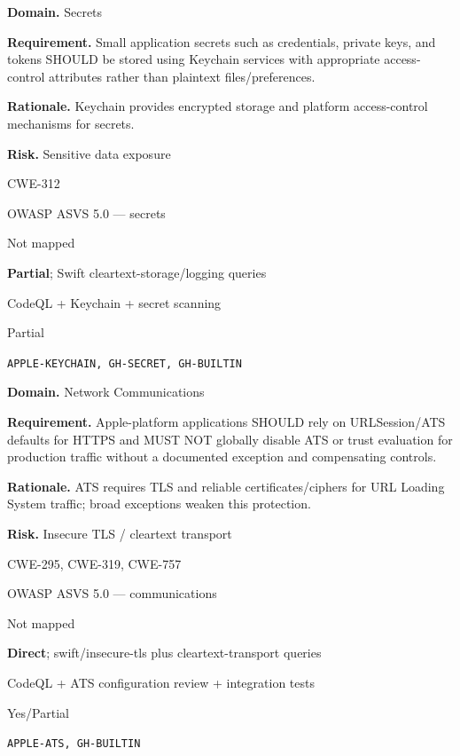 \documentclass[10pt,letterpaper]{article}
\newcommand{\prioritybadge}[2]{\tcbox[on line,boxrule=0pt,arc=1.2mm,boxsep=0.7mm,left=1mm,right=1mm,top=0.4mm,bottom=0.4mm,colback=#2!12,coltext=#2]{\scriptsize\bfseries #1}}
\begin{document}
\begin{rulebox}[title={\texttt{SCS-SWIFT-SECRET-001} \hfill \prioritybadge{Critical Control}{Critical}}]
\textbf{Domain.} Secrets

\textbf{Requirement.} Small application secrets such as credentials, private keys, and tokens SHOULD be stored using Keychain services with appropriate access-control attributes rather than plaintext files/preferences.

\textbf{Rationale.} Keychain provides encrypted storage and platform access-control mechanisms for secrets.

\textbf{Risk.} Sensitive data exposure

\begin{description}[leftmargin=2.65cm,labelwidth=2.3cm,style=nextline,itemsep=1pt,topsep=3pt]
  \item[CWE] CWE-312
  \item[OWASP] OWASP ASVS 5.0 --- secrets
  \item[CERT] Not mapped
  \item[CodeQL] \textbf{Partial}; Swift cleartext-storage/logging queries
  \item[Enforcement] CodeQL + Keychain + secret scanning
  \item[Automation] Partial
  \item[Sources] \texttt{APPLE-KEYCHAIN, GH-SECRET, GH-BUILTIN}
\end{description}
\end{rulebox}

\begin{rulebox}[title={\texttt{SCS-SWIFT-NET-001} \hfill \prioritybadge{Critical Control}{Critical}}]
\textbf{Domain.} Network Communications

\textbf{Requirement.} Apple-platform applications SHOULD rely on URLSession/ATS defaults for HTTPS and MUST NOT globally disable ATS or trust evaluation for production traffic without a documented exception and compensating controls.

\textbf{Rationale.} ATS requires TLS and reliable certificates/ciphers for URL Loading System traffic; broad exceptions weaken this protection.

\textbf{Risk.} Insecure TLS / cleartext transport

\begin{description}[leftmargin=2.65cm,labelwidth=2.3cm,style=nextline,itemsep=1pt,topsep=3pt]
  \item[CWE] CWE-295, CWE-319, CWE-757
  \item[OWASP] OWASP ASVS 5.0 --- communications
  \item[CERT] Not mapped
  \item[CodeQL] \textbf{Direct}; swift/insecure-tls plus cleartext-transport queries
  \item[Enforcement] CodeQL + ATS configuration review + integration tests
  \item[Automation] Yes/Partial
  \item[Sources] \texttt{APPLE-ATS, GH-BUILTIN}
\end{description}
\end{rulebox}
\end{document}

